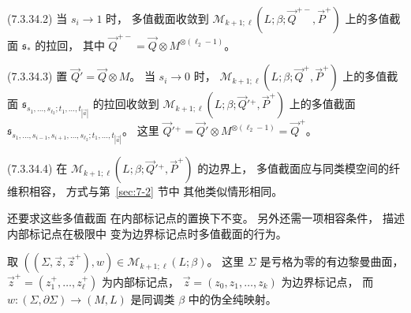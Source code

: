 \par\noindent\textup{(7.3.34.2)}\label{cond:7-3-34-2}\quad
当 $s_i\to1$ 时，
多值截面收敛到
$\mathcal M_{k+1;\ell}
(L;\beta;\vec Q^{+-},\vec P^+)$
上的多值截面 $\mathfrak s_*$ 的拉回，
其中
$\vec Q^{+-}
=\vec Q\otimes M^{\otimes(\ell_2-1)}$。

\par\noindent\textup{(7.3.34.3)}\label{cond:7-3-34-3}\quad
置 $\vec Q'=\vec Q\otimes M$。
当 $s_i\to0$ 时，
$\mathcal M_{k+1;\ell}
(L;\beta;\vec Q^+,\vec P^+)$
上的多值截面
$\mathfrak s_{s_1,\ldots,s_{\ell_2};
t_1,\ldots,t_{|\vec a|}}$
的拉回收敛到
$\mathcal M_{k+1;\ell}
(L;\beta;\vec Q'{}^+,\vec P^+)$
上的多值截面
$\mathfrak s_{s_1,\ldots,s_{i-1},
s_{i+1},\ldots,s_{\ell_2};
t_1,\ldots,t_{|\vec a|}}$。
这里
$\vec Q'{}^+
=\vec Q'\otimes M^{\otimes(\ell_2-1)}
=\vec Q^+$。

\par\noindent\textup{(7.3.34.4)}\label{cond:7-3-34-4}\quad
在
$\mathcal M_{k+1;\ell}
(L;\beta;\vec Q'{}^+,\vec P^+)$
的边界上，
多值截面应与同类模空间的纤维积相容，
方式与第~\ref{sec:7-2} 节中
其他类似情形相同。

还要求这些多值截面
在内部标记点的置换下不变。
另外还需一项相容条件，
描述内部标记点在极限中
变为边界标记点时多值截面的行为。

取
$((\Sigma,\vec z,\vec z^+),w)
\in\mathcal M_{k+1;\ell}(L;\beta)$。
这里 $\Sigma$ 是亏格为零的有边黎曼曲面，
$\vec z^+=(z_1^+,\ldots,z_\ell^+)$
为内部标记点，
$\vec z=(z_0,z_1,\ldots,z_k)$
为边界标记点，
而
$w\colon(\Sigma,\partial\Sigma)\to(M,L)$
是同调类 $\beta$ 中的伪全纯映射。


